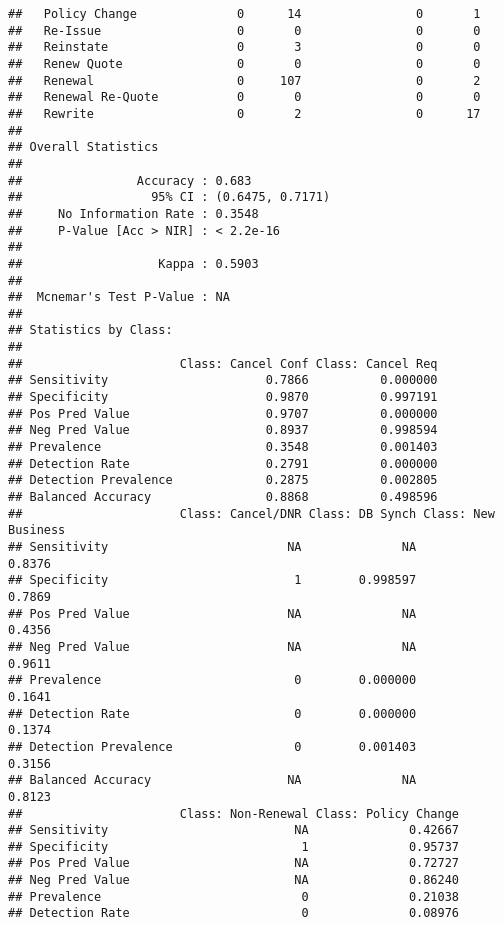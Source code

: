 \documentclass[]{article}
\begin{document}
\begin{verbatim}
##   Policy Change              0      14                0       1
##   Re-Issue                   0       0                0       0
##   Reinstate                  0       3                0       0
##   Renew Quote                0       0                0       0
##   Renewal                    0     107                0       2
##   Renewal Re-Quote           0       0                0       0
##   Rewrite                    0       2                0      17
## 
## Overall Statistics
##                                           
##                Accuracy : 0.683           
##                  95% CI : (0.6475, 0.7171)
##     No Information Rate : 0.3548          
##     P-Value [Acc > NIR] : < 2.2e-16       
##                                           
##                   Kappa : 0.5903          
##                                           
##  Mcnemar's Test P-Value : NA              
## 
## Statistics by Class:
## 
##                      Class: Cancel Conf Class: Cancel Req
## Sensitivity                      0.7866          0.000000
## Specificity                      0.9870          0.997191
## Pos Pred Value                   0.9707          0.000000
## Neg Pred Value                   0.8937          0.998594
## Prevalence                       0.3548          0.001403
## Detection Rate                   0.2791          0.000000
## Detection Prevalence             0.2875          0.002805
## Balanced Accuracy                0.8868          0.498596
##                      Class: Cancel/DNR Class: DB Synch Class: New Business
## Sensitivity                         NA              NA              0.8376
## Specificity                          1        0.998597              0.7869
## Pos Pred Value                      NA              NA              0.4356
## Neg Pred Value                      NA              NA              0.9611
## Prevalence                           0        0.000000              0.1641
## Detection Rate                       0        0.000000              0.1374
## Detection Prevalence                 0        0.001403              0.3156
## Balanced Accuracy                   NA              NA              0.8123
##                      Class: Non-Renewal Class: Policy Change
## Sensitivity                          NA              0.42667
## Specificity                           1              0.95737
## Pos Pred Value                       NA              0.72727
## Neg Pred Value                       NA              0.86240
## Prevalence                            0              0.21038
## Detection Rate                        0              0.08976

\end{verbatim}
\end{document}
